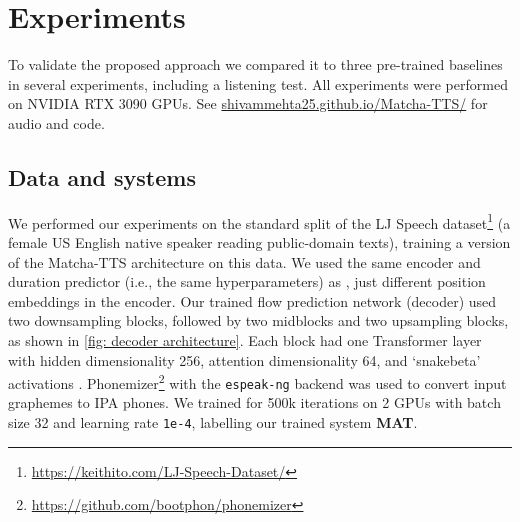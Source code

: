 \documentclass[british]{article}
\newcommand{\customurl}[1]{\url{#1}}
\newcommand{\webpageurl}{https://shivammehta25.github.io/Matcha-TTS/}
\newcommand{\webpageurltext}{shivammehta25.github.io/Matcha-TTS/}
\begin{document}
\section{Experiments}
\label{sec:experiments}
To validate the proposed approach we compared it to three pre-trained baselines in several experiments, including a listening test.
All experiments were performed on NVIDIA RTX 3090 GPUs.
See \href{\webpageurl}{\webpageurltext} for audio and code.

\subsection{Data and systems}
\label{ssec:systems}


We performed our experiments on the standard split of the LJ Speech dataset\footnote{\customurl{https://keithito.com/LJ-Speech-Dataset/}} (a female US English native speaker reading public-domain texts), training a version of the Matcha-TTS architecture on this data.
We used the same encoder and duration predictor (i.e., the same hyperparameters) as \cite{popov2021grad}, just different position embeddings in the encoder.
Our trained flow prediction network (decoder) used two downsampling blocks, followed by two midblocks and two upsampling blocks, as shown in \cref{fig: decoder architecture}.
Each block had one Transformer layer with hidden dimensionality 256, attention dimensionality 64, and `snakebeta' activations \cite{lee2023bigvgan}.
Phonemizer\footnote{\customurl{https://github.com/bootphon/phonemizer}} \cite{bernard2021phonemizer} with the \texttt{espeak-ng} backend was used to convert input graphemes to IPA phones.
We trained for 500k iterations on 2 GPUs with batch size 32 and learning rate \texttt{1e-4}, labelling our trained system \textbf{MAT}.
\end{document}
